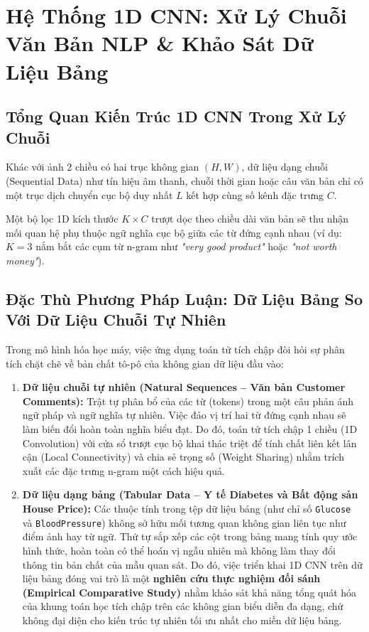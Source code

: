 \documentclass[12pt,a4paper]{report}
\begin{document}
\chapter{Hệ Thống 1D CNN: Xử Lý Chuỗi Văn Bản NLP \& Khảo Sát Dữ Liệu Bảng}

\section{Tổng Quan Kiến Trúc 1D CNN Trong Xử Lý Chuỗi}
Khác với ảnh 2 chiều có hai trục không gian $(H, W)$, dữ liệu dạng chuỗi (Sequential Data) như tín hiệu âm thanh, chuỗi thời gian hoặc câu văn bản chỉ có một trục dịch chuyển cục bộ duy nhất $L$ kết hợp cùng số kênh đặc trưng $C$. 

Một bộ lọc 1D kích thước $K \times C$ trượt dọc theo chiều dài văn bản sẽ thu nhận mối quan hệ phụ thuộc ngữ nghĩa cục bộ giữa các từ đứng cạnh nhau (ví dụ: $K=3$ nắm bắt các cụm từ n-gram như \textit{"very good product"} hoặc \textit{"not worth money"}).

\section{Đặc Thù Phương Pháp Luận: Dữ Liệu Bảng So Với Dữ Liệu Chuỗi Tự Nhiên}
Trong mô hình hóa học máy, việc ứng dụng toán tử tích chập đòi hỏi sự phân tích chặt chẽ về bản chất tô-pô của không gian dữ liệu đầu vào:

\begin{enumerate}
    \item \textbf{Dữ liệu chuỗi tự nhiên (Natural Sequences -- Văn bản Customer Comments):} Trật tự phân bổ của các từ (tokens) trong một câu phản ánh ngữ pháp và ngữ nghĩa tự nhiên. Việc đảo vị trí hai từ đứng cạnh nhau sẽ làm biến đổi hoàn toàn nghĩa biểu đạt. Do đó, toán tử tích chập 1 chiều (1D Convolution) với cửa sổ trượt cục bộ khai thác triệt để tính chất liên kết lân cận (Local Connectivity) và chia sẻ trọng số (Weight Sharing) nhằm trích xuất các đặc trưng n-gram một cách hiệu quả.
    
    \item \textbf{Dữ liệu dạng bảng (Tabular Data -- Y tế Diabetes và Bất động sản House Price):} Các thuộc tính trong tệp dữ liệu bảng (như chỉ số \texttt{Glucose} và \texttt{BloodPressure}) không sở hữu mối tương quan không gian liên tục như điểm ảnh hay từ ngữ. Thứ tự sắp xếp các cột trong bảng mang tính quy ước hình thức, hoàn toàn có thể hoán vị ngẫu nhiên mà không làm thay đổi thông tin bản chất của mẫu quan sát. Do đó, việc triển khai 1D CNN trên dữ liệu bảng đóng vai trò là một \textbf{nghiên cứu thực nghiệm đối sánh (Empirical Comparative Study)} nhằm khảo sát khả năng tổng quát hóa của khung toán học tích chập trên các không gian biểu diễn đa dạng, chứ không đại diện cho kiến trúc tự nhiên tối ưu nhất cho miền dữ liệu bảng.
\end{enumerate}
\end{document}
